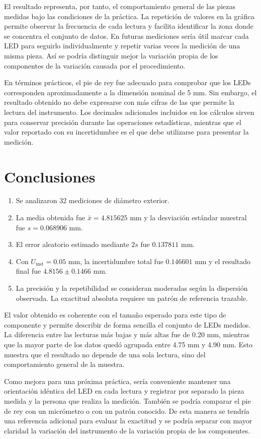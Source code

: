 \documentclass[paper=a4, fontsize=11pt]{scrartcl}
\numberwithin{equation}{section}
\numberwithin{figure}{section}
\numberwithin{table}{section}
\begin{document}
El resultado representa, por tanto, el comportamiento general de las piezas medidas bajo las condiciones de la práctica. La repetición de valores en la gráfica permite observar la frecuencia de cada lectura y facilita identificar la zona donde se concentra el conjunto de datos. En futuras mediciones sería útil marcar cada LED para seguirlo individualmente y repetir varias veces la medición de una misma pieza. Así se podría distinguir mejor la variación propia de los componentes de la variación causada por el procedimiento.

En términos prácticos, el pie de rey fue adecuado para comprobar que los LEDs corresponden aproximadamente a la dimensión nominal de 5 mm. Sin embargo, el resultado obtenido no debe expresarse con más cifras de las que permite la lectura del instrumento. Los decimales adicionales incluidos en los cálculos sirven para conservar precisión durante las operaciones estadísticas, mientras que el valor reportado con su incertidumbre es el que debe utilizarse para presentar la medición.

\section{Conclusiones}
\begin{enumerate}
    \item Se analizaron 32 mediciones de diámetro exterior.
    \item La media obtenida fue $\bar{x}=4.815625$ mm y la desviación estándar muestral fue $s=0.068906$ mm.
    \item El error aleatorio estimado mediante $2s$ fue $0.137811$ mm.
    \item Con $U_{\mathrm{inst}}=0.05$ mm, la incertidumbre total fue $0.146601$ mm y el resultado final fue $4.8156\pm0.1466$ mm.
    \item La precisión y la repetibilidad se consideran moderadas según la dispersión observada. La exactitud absoluta requiere un patrón de referencia trazable.
\end{enumerate}

El valor obtenido es coherente con el tamaño esperado para este tipo de componente y permite describir de forma sencilla el conjunto de LEDs medidos. La diferencia entre las lecturas más bajas y más altas fue de 0.20 mm, mientras que la mayor parte de los datos quedó agrupada entre 4.75 mm y 4.90 mm. Esto muestra que el resultado no depende de una sola lectura, sino del comportamiento general de la muestra.

Como mejora para una próxima práctica, sería conveniente mantener una orientación idéntica del LED en cada lectura y registrar por separado la pieza medida y la persona que realiza la medición. También se podría comparar el pie de rey con un micrómetro o con un patrón conocido. De esta manera se tendría una referencia adicional para evaluar la exactitud y se podría separar con mayor claridad la variación del instrumento de la variación propia de los componentes.
\end{document}
